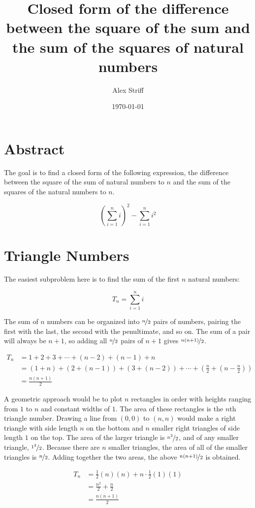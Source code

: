 \documentclass[final,letterpaper]{article}
\title{Closed form of the difference between the square of the sum and the sum
of the squares of natural numbers}
\author{Alex Striff}
\date\today
\begin{document}
\maketitle

\section{Abstract}

The goal is to find a closed form of the following expression, the difference
between the square of the sum of natural numbers to $n$ and the sum of the
squares of the natural numbers to $n$.

\[
	{\left(\sum_{i=1}^{n}{i}\right)}^2 - \sum_{i=1}^{n}{i^2}
\]

\section{Triangle Numbers}

The easiest subproblem here is to find the sum of the first $n$ natural numbers:

\[
	T_n = \sum_{i=1}^{n}{i}
\]

The sum of $n$ numbers can be organized into $\nicefrac{n}{2}$ pairs of numbers,
pairing the first with the last, the second with the penultimate, and so on. The
sum of a pair will always be $n + 1$, so adding all $\nicefrac{n}{2}$ pairs of
$n + 1$ gives $\nicefrac{n (n + 1)}{2}$.

\begin{align*}
	T_n &= 1 + 2 + 3 + \cdots + (n - 2) + (n - 1) + n \\
	&= (1 + n) + (2 + (n - 1)) + (3 + (n - 2)) + \cdots
	+ (\frac{n}{2} + (n - \frac{n}{2})) \\
	&= \frac{n (n + 1)}{2}
\end{align*}

A geometric approach would be to plot $n$ rectangles in order with heights
ranging from $1$ to $n$ and constant widths of $1$. The area of these rectangles
is the $n$th triangle number. Drawing a line from $(0, 0)$ to $(n, n)$ would
make a right triangle with side length $n$ on the bottom and $n$ smaller right
triangles of side length $1$ on the top. The area of the larger triangle is
$\nicefrac{n^2}{2}$, and of any smaller triangle, $\nicefrac{1^2}{2}$. Because
there are $n$ smaller triangles, the area of all of the smaller triangles is
$\nicefrac{n}{2}$. Adding together the two areas, the above $\nicefrac{n (n +
1)}{2}$ is obtained.

\begin{align*}
	T_n &= \frac{1}{2}(n)(n) + n \cdot \frac{1}{2}(1)(1) \\
	&= \frac{n^2}{2} + \frac{n}{2} \\
	&= \frac{n (n + 1)}{2}
\end{align*}
\end{document}

